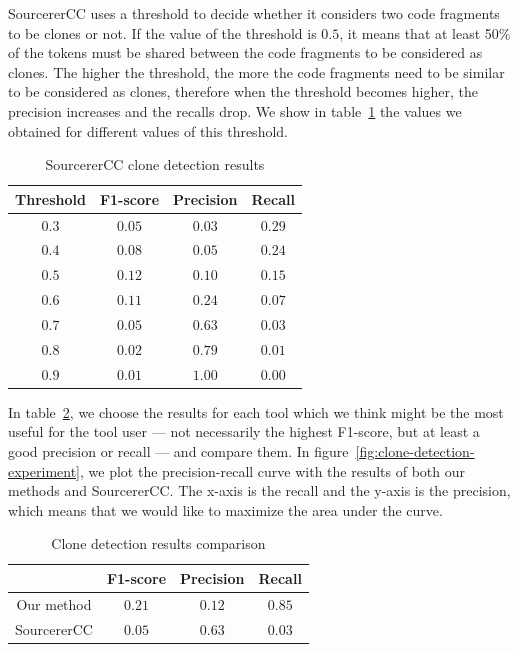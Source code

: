 SourcererCC uses a threshold to decide whether it considers two code fragments
to be clones or not. If the value of the threshold is $0.5$, it means that at
least 50\% of the tokens must be shared between the code fragments to be
considered as clones. The higher the threshold, the more the code fragments need
to be similar to be considered as clones, therefore when the threshold becomes
higher, the precision increases and the recalls drop. We show in
table~\ref{tab:sourcerer-cc-results} the values we obtained for different values
of this threshold.

\begin{table}
  \caption{\label{tab:sourcerer-cc-results}SourcererCC clone detection results}
  \begin{center}
    \begin{tabular}{c c c c}
      \toprule
      Threshold & F1-score & Precision & Recall\\
      \toprule
      $0.3$ & $0.05$ & $0.03$ & $0.29$\\
      $0.4$ & $0.08$ & $0.05$ & $0.24$\\
      \rowcolor{verylightgray} $0.5$ & $0.12$ & $0.10$ & $0.15$\\
      $0.6$ & $0.11$ & $0.24$ & $0.07$\\
      $0.7$ & $0.05$ & $0.63$ & $0.03$\\
      $0.8$ & $0.02$ & $0.79$ & $0.01$\\
      $0.9$ & $0.01$ & $1.00$ & $0.00$\\
      \bottomrule
    \end{tabular}
  \end{center}
\end{table}

In table~\ref{tab:clone-detection-full-results}, we choose the results for each
tool which we think might be the most useful for the tool user --- not
necessarily the highest F1-score, but at least a good precision or recall ---
and compare them. In figure~\ref{fig:clone-detection-experiment}, we plot the
precision-recall curve with the results of both our methods and SourcererCC. The
x-axis is the recall and the y-axis is the precision, which means that we would
like to maximize the area under the curve.

\begin{table}
  \caption{\label{tab:clone-detection-full-results}Clone detection results comparison}
  \begin{center}
    \begin{tabular}{c c c c}
      \toprule
       & F1-score & Precision & Recall\\
      \toprule
      Our method & $0.21$ & $0.12$ & $0.85$\\
      SourcererCC & $0.05$ & $0.63$ & $0.03$\\
      \bottomrule
    \end{tabular}
  \end{center}
\end{table}


